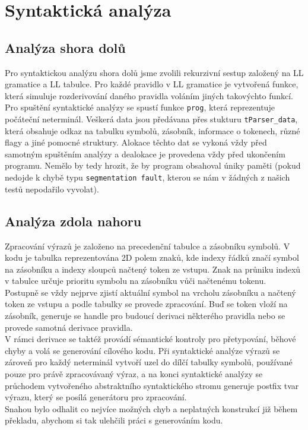 \documentclass[12pt, a4paper]{article}
\begin{document}
\section{Syntaktická analýza}
\justifying

\subsection{Analýza shora dolů}
\justifying
Pro syntaktickou analýzu shora dolů jsme zvolili rekurzivní sestup založený na LL gramatice a LL tabulce. Pro každé pravidlo v LL gramatice je vytvořená funkce, která simuluje rozderivování daného pravidla voláním jiných takovýchto funkcí. Pro spuštění syntaktické analýzy se spustí funkce \texttt{prog}, která reprezentuje počáteční neterminál. Veškerá data jsou předávana přes stukturu \texttt{tParser\_data}, která obsahuje odkaz na tabulku symbolů, zásobník, informace o tokenech, různé flagy a jiné pomocné struktury. Alokace těchto dat se vykoná vždy před samotným spuštěním analýzy a dealokace je provedena vždy před ukončením programu. Nemělo by tedy hrozit, že by program obsahoval úniky paměti (pokud nedojde k chybě typu \texttt{segmentation fault}, kterou se nám v žádných z našich testů nepodařilo vyvolat).

\subsection{Analýza zdola nahoru}
\justifying
Zpracování výrazů je založeno na precedenční tabulce a zásobníku symbolů. V kodu je tabulka reprezentována 2D polem znaků, kde indexy řádků značí symbol na zásobníku a indexy sloupců načtený token ze vstupu. Znak na průniku indexů v tabulce určuje prioritu symbolu na zásobníku vůči načtenému tokenu. \\
Postupně se vždy nejprve zjistí aktuální symbol na vrcholu zásobníku a načtený token ze vstupu a podle tabulky se provede zpracování. Buď se token vloží na zásobník, generuje se handle pro budoucí derivaci některého pravidla nebo se provede samotná derivace pravidla. \\
V rámci derivace se taktéž provádí sémantické kontroly pro přetypování, běhové chyby a volá se generování cílového kodu. Při syntaktické analýze výrazů se zároveň pro každý neterminál vytvoří uzel do dílčí tabulky symbolů, používané pouze pro právě zpracovávaný výraz, a na konci syntaktické analýzy se průchodem vytvořeného abstraktního syntaktického stromu generuje postfix tvar výrazu, který se posílá generátoru pro zpracování. \\
Snahou bylo odhalit co nejvíce možných chyb a neplatných konstrukcí již během překladu, abychom si tak ulehčili práci s generováním kodu.
\end{document}
